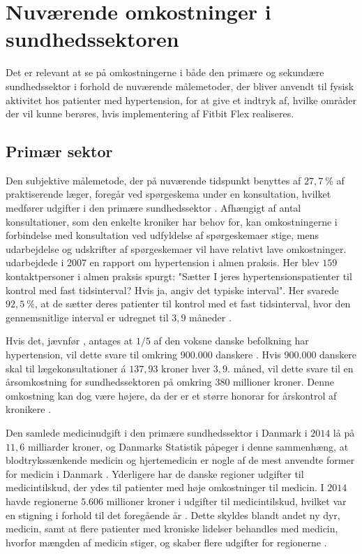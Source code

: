 \section{Nuværende omkostninger i sundhedssektoren}
Det er relevant at se på omkostningerne i både den primære og sekundære sundhedssektor i forhold de nuværende målemetoder, der bliver anvendt til fysisk aktivitet hos patienter med hypertension, for at give et indtryk af, hvilke områder der vil kunne berøres, hvis implementering af Fitbit Flex realiseres.

\subsection{Primær sektor} \label{sec:nuv_primaer}
\label{sec:primaer_sektor_omkostninger}
Den subjektive målemetode, der på nuværende tidspunkt benyttes af $27,7~\%$ af praktiserende læger, foregår ved spørgeskema under en konsultation, hvilket medfører udgifter i den primære sundhedssektor \citep{munck2007}. Afhængigt af antal konsultationer, som den enkelte kroniker har behov for, kan omkostningerne i forbindelse med konsultation ved udfyldelse af spørgeskemaer stige, mens udarbejdelse og udskrifter af spørgeskemaer vil have relativt lave omkostninger.
\citeauthor{munck2007} udarbejdede i 2007 en rapport om hypertension i almen praksis. Her blev $159$ kontaktpersoner i almen praksis spurgt: "Sætter I jeres hypertensionspatienter til kontrol med fast tidsinterval? Hvis ja, angiv det typiske interval". Her svarede $92,5~\%$, at de sætter deres patienter til kontrol med et fast tidsinterval, hvor den gennemsnitlige interval er udregnet til $3,9$ måneder \citep{munck2007}. 

Hvis det, jævnfør \citeauthor{kronborg2008}, antages at $1/5$ af den voksne danske befolkning har hypertension, vil dette svare til omkring $900.000$ danskere \citep{folketal2016}. Hvis $900.000$ danskere skal til lægekonsultationer á $137,93$ kroner hver $3,9$. måned, vil dette svare til en årsomkostning for sundhedssektoren på omkring $380$ millioner kroner. Denne omkostning kan dog være højere, da der er et større honorar for årskontrol af kronikere \citep{honorartabel2016}. 

Den samlede medicinudgift i den primære sundhedssektor i Danmark i $2014$ lå på $11,6$ milliarder kroner, og Danmarks Statistik påpeger i denne sammenhæng, at blodtrykssænkende medicin og hjertemedicin er nogle af de mest anvendte former for medicin i Danmark \citep{dst2016}. Yderligere har de danske regioner udgifter til medicintilskud, der ydes til patienter med høje omkostninger til medicin. I $2014$ havde regionerne $5.606$ millioner kroner i udgifter til medicintilskud, hvilket var en stigning i forhold til det foregående år \citep{medicinoekonomi2015}. Dette skyldes blandt andet ny dyr, medicin, samt at flere patienter med kroniske lidelser behandles med medicin, hvorfor mængden af medicin stiger, og skaber flere udgifter for regionerne \citep{regioner2015}. 

